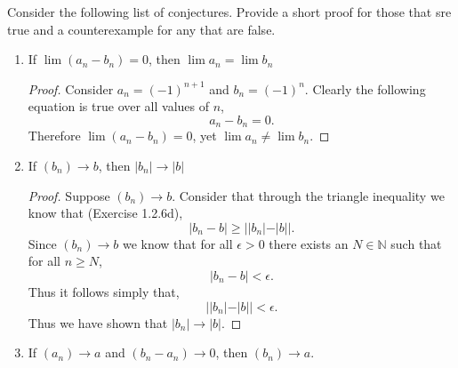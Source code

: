 \documentclass[12pt]{article}
\makeatletter
\theoremstyle{homework}
\newenvironment{exercise}[1]
{\def\@currentlabel{#1}\exercisecore}
{\endexercisecore}
\newcommand{\Nats}{\ensuremath{\mathbb N}}
\makeatother
\begin{document}
\begin{exercise}{2.3.10} Consider the following list of conjectures. Provide a short proof for those that sre true and a 
  counterexample for any that are false. 
  \begin{enumerate}
    \item If $\lim (a_n - b_n) = 0$, then $\lim a_n = \lim b_n$\\
    
    \begin{proof}
      Consider $a_n = (-1)^{n+1}$ and $b_n = (-1)^n$. Clearly the following equation is true over all values of $n$,
      \begin{equation*}
        a_n - b_n = 0.
      \end{equation*}
      Therefore $\lim (a_n - b_n) = 0$, yet $\lim a_n \neq \lim b_n$.
    \end{proof}
    \vspace{.25in}

    \item If $(b_n) \to b$, then $|b_n| \to |b|$\\
    
    \begin{proof}
      Suppose $(b_n) \to b$. Consider that through the triangle inequality we know that (Exercise 1.2.6d),
      \begin{equation*}
        |b_n - b| \geq ||b_n| - |b||. 
      \end{equation*}
      Since $(b_n) \to b$ we know that for all $\epsilon > 0$ there exists an $N \in \Nats $ such that for all $n\geq N$,
      \begin{equation*}
        |b_n - b|< \epsilon.
      \end{equation*}
      Thus it follows simply that,
      \begin{equation*}
        ||b_n| - |b|| < \epsilon.
      \end{equation*}
      Thus we have shown that $|b_n| \to |b|$. 
    \end{proof}

    \item If $(a_n) \to a$ and $(b_n - a_n) \to 0$, then $(b_n) \to a$.\\
    

\end{enumerate}
\end{exercise}
\end{document}
